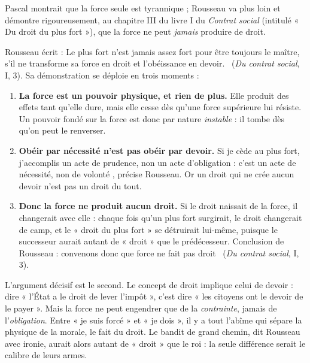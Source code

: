 \documentclass[11pt]{article}
\newcommand{\cle}[1]{{\popxbold\color{popdark}#1}}
\begin{document}
Pascal montrait que la force seule est tyrannique ; Rousseau va plus loin et démontre rigoureusement, au chapitre III du livre I du \emph{Contrat social} (intitulé « Du droit du plus fort »), que la force ne peut \emph{jamais} produire de droit.

\begin{propriete}
Rousseau écrit : \guillemotleft Le plus fort n'est jamais assez fort pour être toujours le maître, s'il ne transforme sa force en droit et l'obéissance en devoir. \guillemotright\ (\emph{Du contrat social}, I, 3). Sa démonstration se déploie en trois moments :
\begin{enumerate}
\item \textbf{La force est un pouvoir physique, et rien de plus.} Elle produit des effets tant qu'elle dure, mais elle cesse dès qu'une force supérieure lui résiste. Un pouvoir fondé sur la force est donc par nature \emph{instable} : il tombe dès qu'on peut le renverser.
\item \textbf{Obéir par nécessité n'est pas obéir par devoir.} Si je cède au plus fort, j'accomplis un acte de prudence, non un acte d'obligation : \guillemotleft c'est un acte de nécessité, non de volonté \guillemotright, précise Rousseau. Or un droit qui ne crée aucun devoir n'est pas un droit du tout.
\item \textbf{Donc la force ne produit aucun droit.} Si le droit naissait de la force, il changerait avec elle : chaque fois qu'un plus fort surgirait, le droit changerait de camp, et le « droit du plus fort » se détruirait lui-même, puisque le successeur aurait autant de « droit » que le prédécesseur. Conclusion de Rousseau : \guillemotleft convenons donc que force ne fait pas droit \guillemotright\ (\emph{Du contrat social}, I, 3).
\end{enumerate}
\end{propriete}

L'argument décisif est le second. Le concept de \cle{droit} implique celui de \cle{devoir} : dire « l'État a le droit de lever l'impôt », c'est dire « les citoyens ont le devoir de le payer ». Mais la force ne peut engendrer que de la \emph{contrainte}, jamais de l'\emph{obligation}. Entre « je suis forcé » et « je dois », il y a tout l'abîme qui sépare la physique de la morale, le fait du droit. Le bandit de grand chemin, dit Rousseau avec ironie, aurait alors autant de « droit » que le roi : la seule différence serait le calibre de leurs armes.
\end{document}
